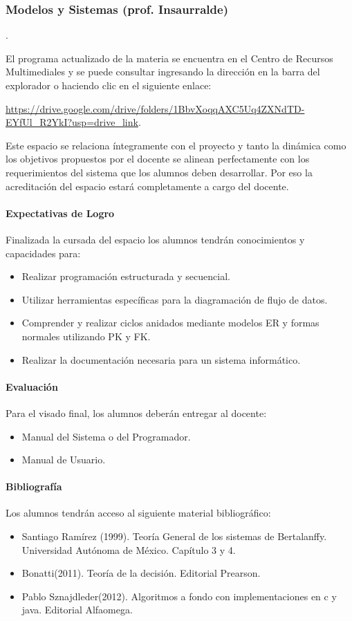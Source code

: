 \subsubsection{Modelos y Sistemas (prof. Insaurralde)}.

El programa actualizado de la materia se encuentra en el Centro de Recursos Multimediales y se puede consultar ingresando la dirección en la barra del explorador o haciendo clic en el siguiente enlace:

\url{https://drive.google.com/drive/folders/1BbvXoqqAXC5Uq4ZXNdTD-EYfUl_R2YkI?usp=drive_link}.

Este espacio se relaciona íntegramente con el proyecto y tanto la dinámica como los objetivos propuestos por el docente se alinean perfectamente con los requerimientos del sistema que los alumnos deben desarrollar. Por eso la acreditación del espacio estará completamente a cargo del docente.

\paragraph{Expectativas de Logro} Finalizada la cursada del espacio los alumnos tendrán conocimientos y capacidades para:

\begin{itemize}
    \item Realizar programación estructurada y secuencial. 
    \item Utilizar herramientas específicas para la diagramación de flujo de datos.
    \item Comprender y realizar ciclos anidados mediante modelos ER y formas normales utilizando PK y FK.
    \item Realizar la documentación necesaria para un sistema informático.
\end{itemize}

\paragraph{Evaluación} Para el visado final, los alumnos deberán entregar al docente:
\begin{itemize}
    \item Manual del Sistema o del Programador.
    \item Manual de Usuario.
\end{itemize}

\paragraph{Bibliografía} Los alumnos tendrán acceso al siguiente material bibliográfico:

\begin{itemize}
    \item Santiago Ramírez (1999). Teoría General de los sistemas de Bertalanffy. Universidad Autónoma de México. Capítulo 3 y 4.
    \item Bonatti(2011). Teoría de la decisión. Editorial Prearson.
    \item Pablo Sznajdleder(2012). Algoritmos a fondo con implementaciones en c y java. Editorial Alfaomega.
\end{itemize}

